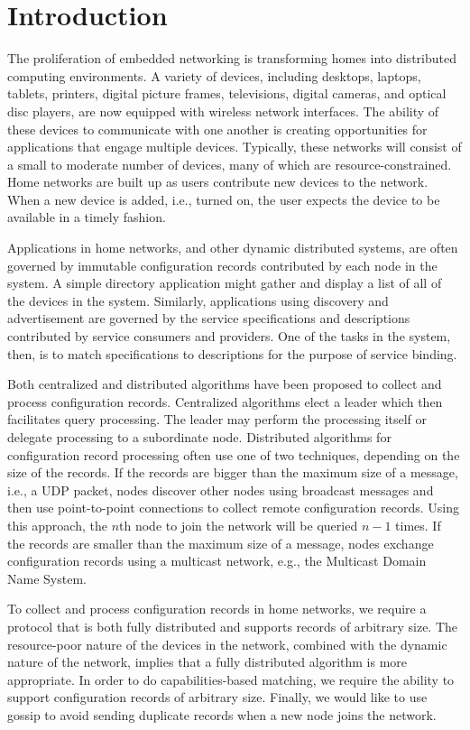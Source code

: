 \documentclass[letterpaper]{article}
\begin{document}
\section{Introduction}
The proliferation of embedded networking is transforming homes into distributed computing environments.
A variety of devices, including desktops, laptops, tablets, printers, digital picture frames, televisions, digital cameras, and optical disc players, are now equipped with wireless network interfaces.
The ability of these devices to communicate with one another is creating opportunities for applications that engage multiple devices.
Typically, these networks will consist of a small to moderate number of devices, many of which are resource-constrained.
Home networks are built up as users contribute new devices to the network.
When a new device is added, i.e., turned on, the user expects the device to be available in a timely fashion.

Applications in home networks, and other dynamic distributed systems, are often governed by immutable configuration records contributed by each node in the system.
A simple directory application might gather and display a list of all of the devices in the system.
Similarly, applications using discovery and advertisement are governed by the service specifications and descriptions contributed by service consumers and providers.
One of the tasks in the system, then, is to match specifications to descriptions for the purpose of service binding.

Both centralized and distributed algorithms have been proposed to collect and process configuration records.
Centralized algorithms elect a leader which then facilitates query processing.
The leader may perform the processing itself or delegate processing to a subordinate node.
Distributed algorithms for configuration record processing often use one of two techniques, depending on the size of the records.
If the records are bigger than the maximum size of a message, i.e., a UDP packet, nodes discover other nodes using broadcast messages and then use point-to-point connections to collect remote configuration records.
Using this approach, the $n$th node to join the network will be queried $n-1$ times.
If the records are smaller than the maximum size of a message, nodes exchange configuration records using a multicast network, e.g., the Multicast Domain Name System.

To collect and process configuration records in home networks, we require a protocol that is both fully distributed and supports records of arbitrary size.
The resource-poor nature of the devices in the network, combined with the dynamic nature of the network, implies that a fully distributed algorithm is more appropriate.
In order to do capabilities-based matching, we require the ability to support configuration records of arbitrary size.
Finally, we would like to use gossip to avoid sending duplicate records when a new node joins the network.
\end{document}
